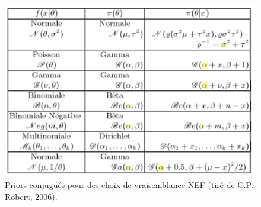 \begin{figure}[h!]
    \centering
    \includegraphics[scale=0.6]{figures/prior/prior.jpeg}
    \caption{Priors conjugués pour des choix de vraisemblance NEF (tiré de C.P. Robert, 2006).}
    \label{conjug}
\end{figure}

